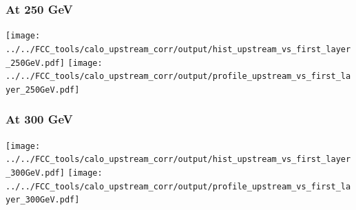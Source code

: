 \documentclass{beamer}
\newcommand{\backupbegin}{%
   \newcounter{finalframe}
   \setcounter{finalframe}{\value{framenumber}}
}
\newcommand{\backupend}{%
   \setcounter{framenumber}{\value{finalframe}}
}
\newcommand{\redtext}[1]{%
  \textcolor{myRed}{#1}
}
\begin{document}
\begin{frame}
  \frametitle{At 250 GeV}

  \texttt{[image: ../../FCC\_tools/calo\_upstream\_corr/output/hist\_upstream\_vs\_first\_layer\_250GeV.pdf]}
  \texttt{[image: ../../FCC\_tools/calo\_upstream\_corr/output/profile\_upstream\_vs\_first\_layer\_250GeV.pdf]}
\end{frame}

\begin{frame}
  \frametitle{At 300 GeV}

  \texttt{[image: ../../FCC\_tools/calo\_upstream\_corr/output/hist\_upstream\_vs\_first\_layer\_300GeV.pdf]}
  \texttt{[image: ../../FCC\_tools/calo\_upstream\_corr/output/profile\_upstream\_vs\_first\_layer\_300GeV.pdf]}
\end{frame}

%
%




\end{document}
